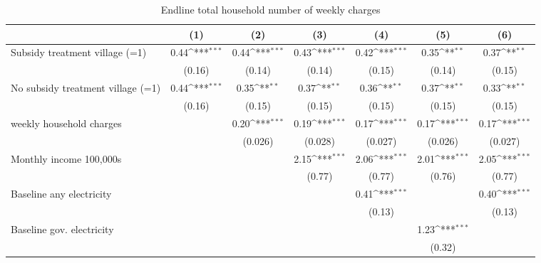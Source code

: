 \begin{table}[htbp]\centering
\def\sym#1{\ifmmode^{#1}\else\(^{#1}\)\fi}
\caption{Endline total household number of weekly charges}
\begin{tabular*}{1\hsize}{@{\hskip\tabcolsep\extracolsep\fill}l*{6}{c}}
\toprule
                &\multicolumn{1}{c}{(1)}         &\multicolumn{1}{c}{(2)}         &\multicolumn{1}{c}{(3)}         &\multicolumn{1}{c}{(4)}         &\multicolumn{1}{c}{(5)}         &\multicolumn{1}{c}{(6)}         \\
\midrule
Subsidy treatment village (=1)&     0.44\sym{***}&     0.44\sym{***}&     0.43\sym{***}&     0.42\sym{***}&     0.35\sym{**} &     0.37\sym{**} \\
                &   (0.16)         &   (0.14)         &   (0.14)         &   (0.15)         &   (0.14)         &   (0.15)         \\
No subsidy treatment village (=1)&     0.44\sym{***}&     0.35\sym{**} &     0.37\sym{**} &     0.36\sym{**} &     0.37\sym{**} &     0.33\sym{**} \\
                &   (0.16)         &   (0.15)         &   (0.15)         &   (0.15)         &   (0.15)         &   (0.15)         \\
weekly household charges&                  &     0.20\sym{***}&     0.19\sym{***}&     0.17\sym{***}&     0.17\sym{***}&     0.17\sym{***}\\
                &                  &  (0.026)         &  (0.028)         &  (0.027)         &  (0.026)         &  (0.027)         \\
Monthly income 100,000s&                  &                  &     2.15\sym{***}&     2.06\sym{***}&     2.01\sym{***}&     2.05\sym{***}\\
                &                  &                  &   (0.77)         &   (0.77)         &   (0.76)         &   (0.77)         \\
Baseline any electricity&                  &                  &                  &     0.41\sym{***}&                  &     0.40\sym{***}\\
                &                  &                  &                  &   (0.13)         &                  &   (0.13)         \\
Baseline gov. electricity&                  &                  &                  &                  &     1.23\sym{***}&                  \\
                &                  &                  &                  &                  &   (0.32)         &                  \\

\end{tabular*}
\end{table}
